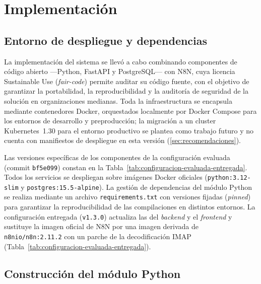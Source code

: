 \section{Implementación}\label{sec:implementacion}

\subsection{Entorno de despliegue y dependencias}\label{subsec:entorno-despliegue}

La implementación del sistema se llevó a cabo combinando componentes de código abierto ---Python, FastAPI y PostgreSQL--- con N8N, cuya licencia Sustainable Use (\emph{fair-code}) permite auditar su código fuente, con el objetivo de garantizar la portabilidad, la reproducibilidad y la auditoría de seguridad de la solución en organizaciones medianas. Toda la infraestructura se encapsula mediante contenedores Docker, orquestados localmente por Docker Compose \parencite{Docker2026_compose} para los entornos de desarrollo y preproducción; la migración a un cluster Kubernetes~1.30 para el entorno productivo se plantea como trabajo futuro y no cuenta con manifiestos de despliegue en esta versión (\autoref{sec:recomendaciones}).

Las versiones específicas de los componentes de la configuración evaluada (commit \texttt{bf5e099}) constan en la Tabla~\ref{tab:configuracion-evaluada-entregada}. Todos los servicios se despliegan sobre imágenes Docker oficiales (\texttt{python:3.12-slim} y \texttt{postgres:15.5-alpine}). La gestión de dependencias del módulo Python se realiza mediante un archivo \texttt{requirements.txt} con versiones fijadas (\emph{pinned}) para garantizar la reproducibilidad de las compilaciones en distintos entornos. La configuración entregada (\texttt{v1.3.0}) actualiza las del \emph{backend} y el \emph{frontend} y sustituye la imagen oficial de N8N por una imagen derivada de \texttt{n8nio/n8n:2.11.2} con un parche de la decodificación IMAP (Tabla~\ref{tab:configuracion-evaluada-entregada}).

\subsection{Construcción del módulo Python}\label{subsec:construccion-modulo-python}

